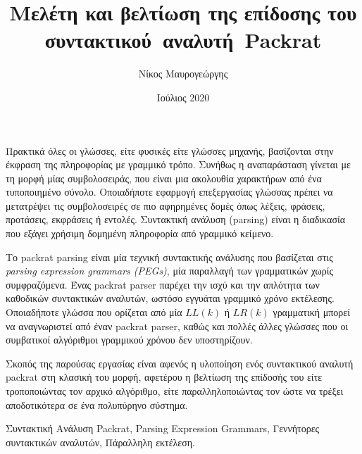 \documentclass[diploma]{softlab-thesis}
\begin{document}

\frontmatter

\title{Μελέτη και βελτίωση της επίδοσης του \mbox{συντακτικού αναλυτή Packrat}}
\author{Νίκος Μαυρογεώργης}
\date{Ιούλιος 2020}




\maketitle



\begin{abstractgr}%
  Πρακτικά όλες οι γλώσσες, είτε φυσικές είτε γλώσσες μηχανής, 
  βασίζονται στην έκφραση της πληροφορίας με γραμμικό τρόπο.
  Συνήθως η αναπαράσταση γίνεται με τη μορφή μίας συμβολοσειράς, 
  που είναι μια ακολουθία χαρακτήρων από ένα τυποποιημένο σύνολο.
  Οποιαδήποτε εφαρμογή επεξεργασίας γλώσσας πρέπει να μετατρέψει τις συμβολοσειρές 
  σε πιο αφηρημένες δομές όπως λέξεις, φράσεις, προτάσεις, εκφράσεις ή εντολές.
  Συντακτική ανάλυση (parsing) είναι η διαδικασία που εξάγει χρήσιμη δομημένη 
  πληροφορία από γραμμικό κείμενο.

  Το packrat parsing είναι μία τεχνική συντακτικής ανάλυσης 
  που βασίζεται στις \emph{parsing expression grammars (PEGs)}, μία παραλλαγή των γραμματικών χωρίς συμφραζόμενα.
  Ένας packrat parser παρέχει την ισχύ και την απλότητα των καθοδικών συντακτικών αναλυτών, 
  ωστόσο εγγυάται γραμμικό χρόνο εκτέλεσης.
  Οποιαδήποτε γλώσσα που ορίζεται από μία $LL(k)$ ή $LR(k)$ γραμματική μπορεί να αναγνωριστεί 
  από έναν packrat parser, καθώς και πολλές άλλες γλώσσες που οι συμβατικοί 
  αλγόριθμοι γραμμικού χρόνου δεν υποστηρίζουν.

  Σκοπός της παρούσας εργασίας είναι αφενός η υλοποίηση ενός συντακτικού αναλυτή
  packrat στη κλασική του μορφή, αφετέρου η βελτίωση της επίδοσής του είτε
  τροποποιώντας τον αρχικό αλγόριθμο, είτε παραλληλοποιώντας τον ώστε να τρέξει
  αποδοτικότερα σε ένα πολυπύρηνο σύστημα.
\begin{keywordsgr}
  Συντακτική Ανάλυση Packrat,
  Parsing Expression Grammars,
  Γεννήτορες συντακτικών αναλυτών,
  Πάραλληλη εκτέλεση.
\end{keywordsgr}
\end{abstractgr}
\end{document}
